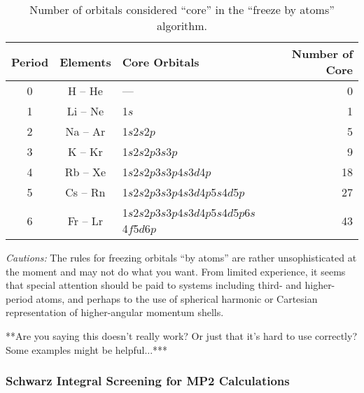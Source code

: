 \begin{table}
\caption{Number of orbitals considered ``core'' in the ``freeze by
atoms'' algorithm.}
\label{tbl:freeze-by-atoms}
\begin{tabular}{cclr}
\hline\hline
Period & Elements & Core Orbitals & Number of Core \\
\hline
0 & H -- He  & ---                                          &  0 \\
1 & Li -- Ne & 1$s$                                         &  1 \\
2 & Na -- Ar & 1$s$2$s$2$p$                                 &  5 \\
3 & K -- Kr  & 1$s$2$s$2$p$3$s$3$p$                         &  9 \\
4 & Rb -- Xe & 1$s$2$s$2$p$3$s$3$p$4$s$3$d$4$p$             & 18 \\
5 & Cs -- Rn & 1$s$2$s$2$p$3$s$3$p$4$s$3$d$4$p$5$s$4$d$5$p$ & 27 \\
6 & Fr -- Lr & 1$s$2$s$2$p$3$s$3$p$4$s$3$d$4$p$5$s$4$d$5$p$6$s$4$f$5$d$6$p$
     & 43 \\
\hline\hline
\end{tabular}
\end{table}



{\em Cautions:\/}  The rules for freezing orbitals ``by atoms'' are
rather unsophisticated at the moment and may not do what you want.
From limited experience, it seems that special attention should be
paid to systems including third- and higher- period atoms, and perhaps
to the use of spherical harmonic or Cartesian representation of
higher-angular momentum shells.

\Large
**Are you saying this doesn't really work?  Or just that it's hard to
use correctly?  Some examples might be helpful...***
\normalsize

\subsubsection{Schwarz Integral Screening for MP2 Calculations}

